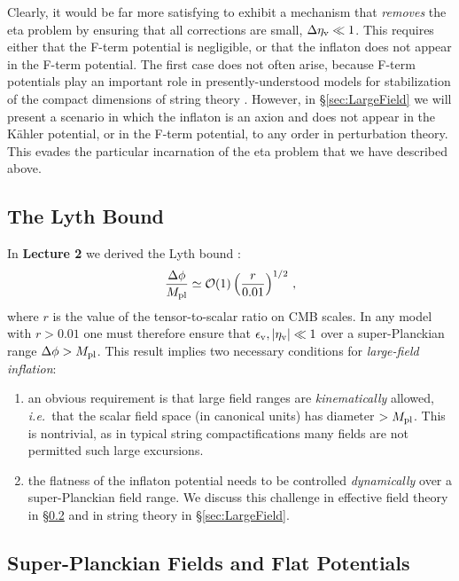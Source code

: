 \documentclass[12pt,letterpaper,rotate]{article}
\def\beq{\begin{equation}}
\def\eeq{\end{equation}}
\begin{document}
{Clearly, it would be far more satisfying to exhibit a mechanism that {\it removes} the eta problem by ensuring that all corrections are small, $\Delta \eta_{\rm v} \ll 1$.  This requires either that the F-term potential is negligible, or that the inflaton does not appear in the F-term potential.  The first case does not often arise, because F-term potentials play an important role in presently-understood models
for stabilization of the compact dimensions of string theory \cite{KKLT}.
However, in \S\ref{sec:LargeField} we will present a scenario in which the inflaton is an axion and does not appear in the K\"ahler potential,
or in the F-term potential, to any order in perturbation theory.
This evades the particular incarnation of the eta problem that we have described above.


\subsection{The Lyth Bound}
\label{sec:lyth}

In {\bf Lecture 2} we derived the Lyth bound \cite{Lyth:1996im}:
\beq
\frac{\Delta \phi}{M_{\rm pl}} \simeq {\cal O}(1) \left(\frac{r}{0.01}\right)^{1/2}\, ,
\eeq
where $r$ is the value of the tensor-to-scalar ratio on CMB scales.
In any model with $r >0.01$ one must therefore ensure that $\epsilon_{\rm v}, |\eta_{\rm v}| \ll 1$ over a super-Planckian range $\Delta \phi > M_{\rm pl}$.
This result implies two necessary conditions for {\it large-field inflation}:
\begin{enumerate}
\item[i)] an obvious requirement is that large field ranges are {\it kinematically} allowed, {\it i.e.}~that the scalar field space (in canonical units) has diameter $> M_{\rm pl}$.
This is nontrivial, as in typical string compactifications many fields are not permitted such large excursions. 
\item[ii)] the flatness of the inflaton potential needs to be controlled {\it dynamically} over a super-Planckian field range.
We discuss this challenge in effective field theory in \S\ref{sec:EFT} and in string theory in \S\ref{sec:LargeField}.
\end{enumerate}

\subsection{Super-Planckian Fields and Flat Potentials}
\label{sec:EFT}

}
\end{document}
